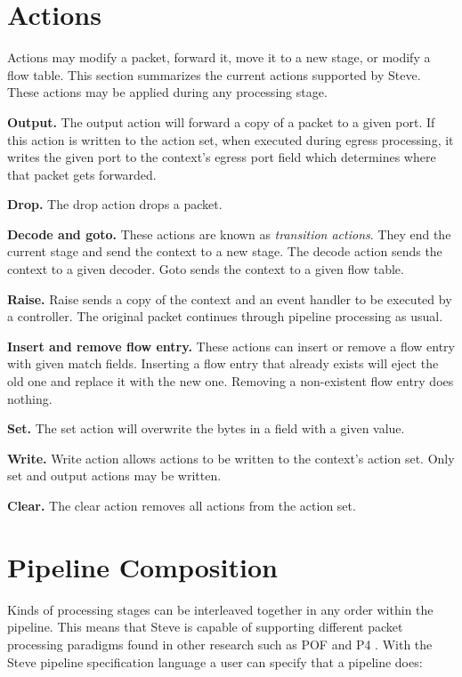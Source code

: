 \section{Actions} \label{action_desc}

Actions may modify a packet, forward it, move it to a new stage, or modify a
flow table. This section summarizes the current actions supported by Steve.
These actions may be applied during any processing stage.

\textbf{Output.} The output action will forward a copy of a packet to a given
port. If this action is written to the action set, when executed during egress
processing, it writes the given port to the context's egress port field which
determines where that packet gets forwarded.

\textbf{Drop.} The drop action drops a packet.

\textbf{Decode and goto.} These actions are known as \textit{transition
actions}. They end the current stage and send the context to a new stage. The
decode action sends the context to a given decoder. Goto sends the context to a
given flow table.

\textbf{Raise.} Raise sends a copy of the context and an event handler to be
executed by a controller. The original packet continues through pipeline
processing as usual.

\textbf{Insert and remove flow entry.} These actions can insert or remove a flow
entry with given match fields. Inserting a flow entry that already exists will
eject the old one and replace it with the new one. Removing a non-existent flow
entry does nothing.

\textbf{Set.} The set action will overwrite the bytes in a field with a given
value.

\textbf{Write.} Write action allows actions to be written to the context's
action set. Only set and output actions may be written.

\textbf{Clear.} The clear action removes all actions from the action set.

\section{Pipeline Composition} \label{pipeline_comp_desc}

Kinds of processing stages can be interleaved together in any order within the
pipeline. This means that Steve is capable of supporting different packet
processing paradigms found in other research such as POF \cite{pof, pof_fis,
pof_impl} and P4 \cite{p4_spec, p4_spec2}. With the Steve pipeline specification
language a user can specify that a pipeline does:

